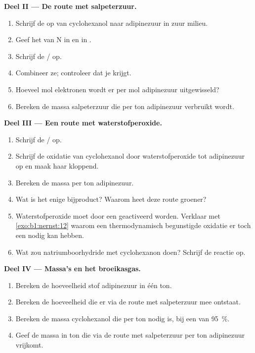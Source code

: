 \begin{problem}
\medskip
\noindent\textbf{Deel II --- De route met salpeterzuur.}
\begin{enumerate}[resume]
  \item Schrijf de  op van cyclohexanol naar adipinezuur in
        zuur milieu.
  \item Geef het  van N in  en in .
  \item Schrijf de  / op.
  \item Combineer ze; controleer dat je
         krijgt.
  \item Hoeveel mol elektronen wordt er per mol adipinezuur uitgewisseld?
  \item Bereken de massa salpeterzuur die per ton adipinezuur verbruikt
        wordt.
\end{enumerate}

\medskip
\noindent\textbf{Deel III --- Een route met waterstofperoxide.}
\begin{enumerate}[resume]
  \item Schrijf de  / op.
  \item Schrijf de oxidatie van cyclohexanol door waterstofperoxide tot
        adipinezuur op en maak haar kloppend.
  \item Bereken de massa  per ton adipinezuur.
  \item Wat is het enige bijproduct? Waarom heet deze route groener?
  \item Waterstofperoxide moet door een  geactiveerd worden.
        Verklaar met \cref{exo:b1:nernst:12} waarom een thermodynamisch
        begunstigde oxidatie er toch een nodig kan hebben.
  \item Wat zou natriumboorhydride met cyclohexanon doen? Schrijf de
        reactie op.
\end{enumerate}

\medskip
\noindent\textbf{Deel IV --- Massa's en het broeikasgas.}
\begin{enumerate}[resume]
  \item Bereken de hoeveelheid stof adipinezuur in één ton.
  \item Bereken de hoeveelheid  die er via de route met
        salpeterzuur mee ontstaat.
  \item Bereken de massa cyclohexanol die per ton nodig is, bij een
         van \qty{95}{\percent}.
  \item Geef de massa  in ton die via de route met salpeterzuur
        per ton adipinezuur vrijkomt.
\end{enumerate}
\end{problem}
